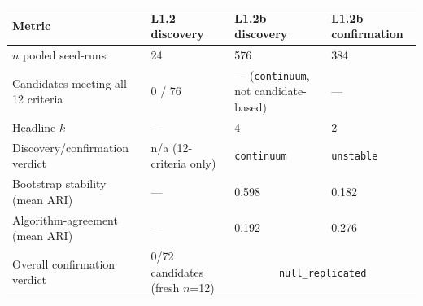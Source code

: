 \begin{tabular}{@{}llll@{}}
\toprule
\textbf{Metric} & \textbf{L1.2 discovery} & \textbf{L1.2b discovery} & \textbf{L1.2b confirmation} \\
\midrule
$n$ pooled seed-runs & 24 & 576 & 384 \\
Candidates meeting all 12 criteria & 0 / 76 & --- (\texttt{continuum}, not candidate-based) & --- \\
Headline $k$ & --- & 4 & 2 \\
Discovery/confirmation verdict & n/a (12-criteria only) & \texttt{continuum} & \texttt{unstable} \\
Bootstrap stability (mean ARI) & --- & 0.598 & 0.182 \\
Algorithm-agreement (mean ARI) & --- & 0.192 & 0.276 \\
Overall confirmation verdict & 0/72 candidates (fresh $n$=12) & \multicolumn{2}{c}{\texttt{null\_replicated}} \\
\bottomrule
\end{tabular}
